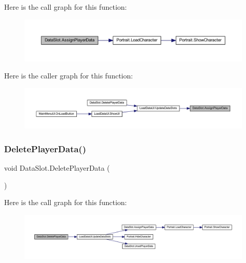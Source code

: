 Here is the call graph for this function\+:\nopagebreak
\begin{figure}[H]
\begin{center}
\leavevmode
\includegraphics[width=350pt]{class_data_slot_a104284ff9c03da56e871e2f39d345e0b_cgraph}
\end{center}
\end{figure}
Here is the caller graph for this function\+:\nopagebreak
\begin{figure}[H]
\begin{center}
\leavevmode
\includegraphics[width=350pt]{class_data_slot_a104284ff9c03da56e871e2f39d345e0b_icgraph}
\end{center}
\end{figure}
\mbox{\label{class_data_slot_aae68b8b9d2f07c2d634e82493d29c05d}} 
\subsubsection{\texorpdfstring{DeletePlayerData()}{DeletePlayerData()}}
{\footnotesize\ttfamily void Data\+Slot.\+Delete\+Player\+Data (\begin{DoxyParamCaption}{ }\end{DoxyParamCaption})}

Here is the call graph for this function\+:\nopagebreak
\begin{figure}[H]
\begin{center}
\leavevmode
\includegraphics[width=350pt]{class_data_slot_aae68b8b9d2f07c2d634e82493d29c05d_cgraph}
\end{center}
\end{figure}
\mbox{\label{class_data_slot_a8c5e92e015138b1ec785465db9ff65a6}} 
